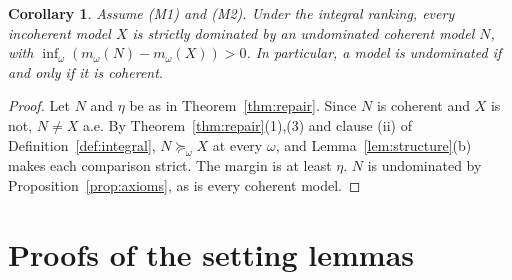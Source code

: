 \documentclass[11pt]{article}
\theoremstyle{plain}
\newtheorem{corollary}[theorem]{Corollary}
\theoremstyle{definition}
\theoremstyle{remark}
\begin{document}
\begin{corollary}\label{cor:repair}
Assume (M1) and (M2). Under the integral ranking, every incoherent model $X$ is strictly
dominated by an undominated coherent model $N$, with $\inf_\omega(m_\omega(N)-m_\omega(X))>0$.
In particular, a model is undominated if and only if it is coherent.
\end{corollary}

\begin{proof}
Let $N$ and $\eta$ be as in Theorem~\ref{thm:repair}. Since $N$ is coherent and $X$ is not,
$N\ne X$ a.e. By Theorem~\ref{thm:repair}(1),(3) and clause (ii) of
Definition~\ref{def:integral}, $N\succeq_\omega X$ at every $\omega$, and
Lemma~\ref{lem:structure}(b) makes each comparison strict. The margin is at least $\eta$. $N$
is undominated by Proposition~\ref{prop:axioms}, as is every coherent model.
\end{proof}

\appendix

\section{Proofs of the setting lemmas}\label{app:setting}
\end{document}
